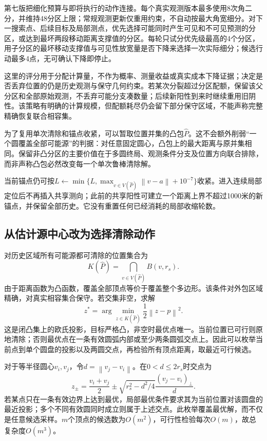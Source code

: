 \documentclass[UTF8,a4paper,zihao=-4,fontset=windows]{ctexart}
\newcommand{\norm}[1]{\left\lVert#1\right\rVert}
\begin{document}
第七版把细化预算与即将执行的动作连接。每个真实观测版本最多使用8次角二分，并维持48分区上限；常规观测更新仅重用约束，不自动按最大角宽细分。对下一搜索点、后续目标及局部测点，优先选择可能同时产生可见和不可见预测的分区，或达到最坏两段移动距离支撑值的分区。每轮只试分优先级最高的4个分区，用子分区的最坏移动支撑值与可见性放宽量是否下降来选择一次实际细分；候选行动最多4点，无可确认下降即停止。

这里的评分用于分配计算量，不作为概率、测量收益或真实成本下降证据；决定是否丢弃位置的仍是历史观测与保守几何约束。若某次分裂超过分区配额，保留该父分区和全部原始观测，不丢弃可能分支凑数量；后续新阳性到来时继续重用旧阴性。该策略有明确的计算规模，但配额耗尽仍会留下部分保守区域，不能声称完整精确恢复联合相容集。

为了复用单次清除和锚点收紧，可以暂取位置并集的凸包$\widehat P$。这不会额外削弱“一个圆覆盖全部可能源”的判据：对任意固定圆心，凸包上的最大距离与原并集相同。保留非凸分区的主要价值在于多圆终局、观测条件分支及位置方向联合排除，而非声称凸包必然改变每一个单次鲁棒清除解。

当前锚点仍可按$L\leftarrow\min\{L,\max_{v\in V(\widehat P)}\norm{v-a}+10^{-7}\}$收紧。进入连续局部定位后不再插入共享测向；此前的共享阳性可建立一个距离上界不超过1000米的新锚点，并保留全部历史。它没有重置任何已经消耗的局部收缩轮数。

\subsection{从估计源中心改为选择清除动作}
对历史区域所有可能源都可清除的位置集合为
\begin{equation}\label{eq:K}
K(\widehat P)=\bigcap_{v\in V(\widehat P)}B(v,r_s).
\end{equation}
由于距离函数为凸函数，覆盖全部顶点等价于覆盖整个多边形。该条件对外包区域精确，对真实相容集合保守。若交集非空，求解
\begin{equation}\label{eq:projection}
z^*=\arg\min_{z\in K(\widehat P)}\frac12\norm{z-p}^2.
\end{equation}
这是闭凸集上的欧氏投影\cite{boyd}，目标严格凸，非空时最优点唯一。当前位置已可行则原地清除；否则最优点在一条有效圆弧内部或至少两条圆弧交点上。因此可以枚举当前点到单个圆盘的投影以及两圆交点，再检验所有顶点距离，取最近可行候选。

对于等半径圆心$v_i,v_j$，令$d=\norm{v_j-v_i}$。在$0<d\le2r_s$时交点为
\begin{equation}
z_\pm=\frac{v_i+v_j}{2}\pm
\sqrt{r_s^2-d^2/4}\frac{(v_j-v_i)_\perp}{d}.
\end{equation}
若某点只在一条有效边界上达到最优，局部最优条件要求其为当前位置对该圆盘的最近投影；多个不同有效圆同时成立则属于上述交点。此枚举覆盖最优解，而不仅是任意候选采样。$m$个顶点的候选数为$O(m^2)$，可行性检验每次$O(m)$，故总复杂度$O(m^3)$。
\end{document}
